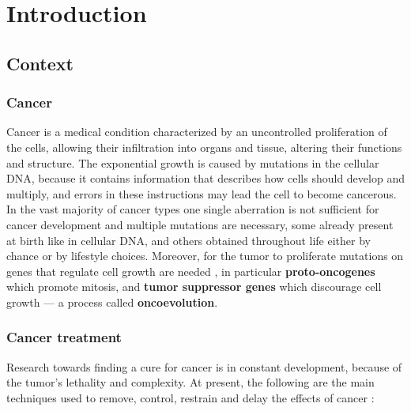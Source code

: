 \chapter{Introduction} \label{chap:introduction}

\section{Context}

\subsection{Cancer}

Cancer is a medical condition characterized by an uncontrolled proliferation of the cells, allowing their infiltration into organs and tissue, altering their functions and structure. The exponential growth is caused by mutations in the cellular DNA, because it contains information that describes how cells should develop and multiply, and errors in these instructions may lead the cell to become cancerous. In the vast majority of cancer types one single aberration is not sufficient for cancer development and multiple mutations are necessary, some already present at birth like in cellular DNA, and others obtained throughout life either by chance or by lifestyle choices. Moreover, for the tumor to proliferate mutations on genes that regulate cell growth are needed \cite{Vogelstein2004}, in particular \textbf{proto-oncogenes} which promote mitosis, and \textbf{tumor suppressor genes} which discourage cell growth --- a process called \textbf{oncoevolution}. 

\subsection{Cancer treatment}

Research towards finding a cure for cancer is in constant development, because of the tumor's lethality and complexity. At present, the following are the main techniques used to remove, control, restrain and delay the effects of cancer \cite{cancer_treat}:

